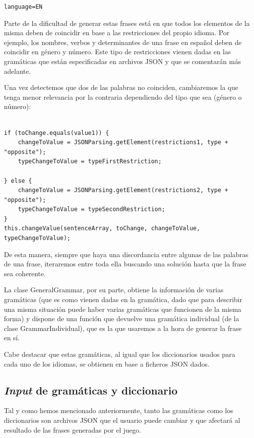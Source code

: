 \begin{verbatim}
language=EN
\end{verbatim}

Parte de la dificultad de generar estas frases está en que todos los elementos de la misma deben de coincidir en base a las restricciones del propio idioma. Por ejemplo, los nombres, verbos y determinantes de una frase en español deben de coincidir en género y número. Este tipo de restricciones vienen dadas en las gramáticas que están especificadas en archivos JSON y que se comentarán más adelante.

Una vez detectemos que dos de las palabras no coinciden, cambiaremos la que tenga menor relevancia por la contraria dependiendo del tipo que sea (género o número):

\begin{lstlisting}[style=java]

if (toChange.equals(value1)) {
    changeToValue = JSONParsing.getElement(restrictions1, type + "opposite");
    typeChangeToValue = typeFirstRestriction; 
     
} else {
    changeToValue = JSONParsing.getElement(restrictions2, type + "opposite");
    typeChangeToValue = typeSecondRestriction;
}
this.changeValue(sentenceArray, toChange, changeToValue, typeChangeToValue);

\end{lstlisting}

De esta manera, siempre que haya una discordancia entre algunas de las palabras de una frase, iteraremos entre toda ella buscando una solución hasta que la frase sea coherente.

La clase GeneralGrammar, por su parte, obtiene la información de varias gramáticas (que es como vienen dadas en la gramática, dado que para describir una misma situación puede haber varias gramáticas que funcionen de la misma forma) y dispone de una función que devuelve una gramática individual (de la clase GrammarIndividual), que es la que usaremos a la hora de generar la frase en sí.  

Cabe destacar que estas gramáticas, al igual que los diccionarios usados para cada uno de los idiomas, se obtienen en base a ficheros JSON dados.

\subsection{\textit{Input} de gramáticas y diccionario}

Tal y como hemos mencionado anteriormente, tanto las gramáticas como los diccionarios son archivos JSON que el usuario puede cambiar y que afectará al resultado de las frases generadas por el juego.

